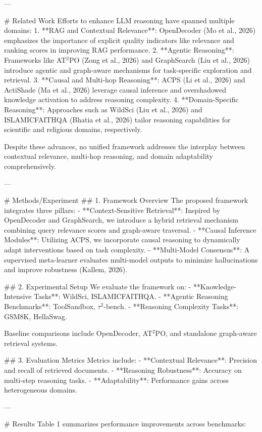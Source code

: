 ---

# Related Work  
Efforts to enhance LLM reasoning have spanned multiple domains:  
1. **RAG and Contextual Relevance**: OpenDecoder (Mo et al., 2026) emphasizes the importance of explicit quality indicators like relevance and ranking scores in improving RAG performance.  
2. **Agentic Reasoning**: Frameworks like AT$^2$PO (Zong et al., 2026) and GraphSearch (Liu et al., 2026) introduce agentic and graph-aware mechanisms for task-specific exploration and retrieval.  
3. **Causal and Multi-hop Reasoning**: ACPS (Li et al., 2026) and ActiShade (Ma et al., 2026) leverage causal inference and overshadowed knowledge activation to address reasoning complexity.  
4. **Domain-Specific Reasoning**: Approaches such as WildSci (Liu et al., 2026) and ISLAMICFAITHQA (Bhatia et al., 2026) tailor reasoning capabilities for scientific and religious domains, respectively.  

Despite these advances, no unified framework addresses the interplay between contextual relevance, multi-hop reasoning, and domain adaptability comprehensively.

---

# Methods/Experiment  
## 1. Framework Overview  
The proposed framework integrates three pillars:  
- **Context-Sensitive Retrieval**: Inspired by OpenDecoder and GraphSearch, we introduce a hybrid retrieval mechanism combining query relevance scores and graph-aware traversal.  
- **Causal Inference Modules**: Utilizing ACPS, we incorporate causal reasoning to dynamically adapt interventions based on task complexity.  
- **Multi-Model Consensus**: A supervised meta-learner evaluates multi-model outputs to minimize hallucinations and improve robustness (Kallem, 2026).

## 2. Experimental Setup  
We evaluate the framework on:  
- **Knowledge-Intensive Tasks**: WildSci, ISLAMICFAITHQA.  
- **Agentic Reasoning Benchmarks**: ToolSandbox, $τ^2$-bench.  
- **Reasoning Complexity Tasks**: GSM8K, HellaSwag.  

Baseline comparisons include OpenDecoder, AT$^2$PO, and standalone graph-aware retrieval systems.

## 3. Evaluation Metrics  
Metrics include:  
- **Contextual Relevance**: Precision and recall of retrieved documents.  
- **Reasoning Robustness**: Accuracy on multi-step reasoning tasks.  
- **Adaptability**: Performance gains across heterogeneous domains.  

---

# Results  
Table 1 summarizes performance improvements across benchmarks:  

